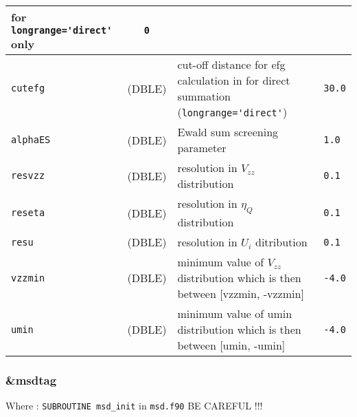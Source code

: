 \documentclass[a4paper]{article}
\begin{document}
\begin{longtable}{l|c|m{8cm}|m{2cm}}
                                              for \verb?longrange='direct'?  only \newline                                         & \verb?0? \\
\hline
\rule[-0.75cm]{0cm}{1.5cm}
\verb?cutefg?          & (DBLE)             & cut-off distance for efg calculation in for direct summation 
                                              (\verb?longrange='direct'?) & \verb?30.0? \\
\hline
\rule[-0.75cm]{0cm}{1.5cm}
\verb?alphaES?         & (DBLE)             & Ewald sum screening parameter                                                        & \verb?1.0? \\
\hline
\rule[-0.75cm]{0cm}{1.5cm}
\verb?resvzz?          & (DBLE)             & resolution in $V_{zz}$ distribution                                                       & \verb?0.1? \\
\hline
\rule[-0.75cm]{0cm}{1.5cm}
\verb?reseta?          & (DBLE)             & resolution in $\eta_Q$ distribution                                                       & \verb?0.1? \\
\hline
\rule[-0.75cm]{0cm}{1.5cm}
\verb?resu?            & (DBLE)             & resolution in $U_i$ ditribution                                                         & \verb?0.1? \\
\hline
\rule[-0.75cm]{0cm}{1.5cm}
\verb?vzzmin?          & (DBLE)             & minimum value of $V_{zz}$ distribution which is then between [vzzmin, -vzzmin]            & \verb?-4.0? \\ 
\hline
\rule[-0.75cm]{0cm}{1.5cm}
\verb?umin?            & (DBLE)             & minimum value of umin distribution which is then between [umin, -umin]               & \verb?-4.0? \\
\hline
\hline
\end{longtable}


\subsubsection{\&msdtag}

Where : \verb?SUBROUTINE msd_init? in \verb?msd.f90?
BE CAREFUL !!!
\newline
\end{document}
